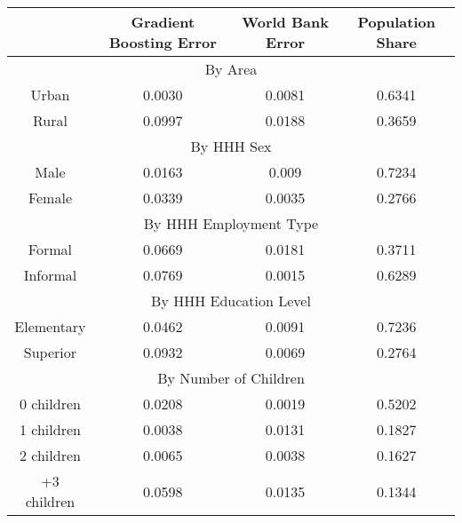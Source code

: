 \begin{table}[]
\begin{tabular}{@{}cccc@{}}
\toprule
            & Gradient Boosting Error & World Bank Error & Population Share \\ \midrule
\multicolumn{4}{c}{By Area}                                                 \\ \midrule
Urban       & 0.0030                  & 0.0081           & 0.6341           \\
Rural       & 0.0997                  & 0.0188           & 0.3659           \\ \midrule
\multicolumn{4}{c}{By HHH Sex}                                              \\ \midrule
Male        & 0.0163                  & 0.009            & 0.7234           \\
Female      & 0.0339                  & 0.0035           & 0.2766           \\ \midrule
\multicolumn{4}{c}{By HHH Employment Type}                                  \\ \midrule
Formal      & 0.0669                  & 0.0181           & 0.3711           \\
Informal    & 0.0769                  & 0.0015           & 0.6289           \\ \midrule
\multicolumn{4}{c}{By HHH Education Level}                                  \\ \midrule
Elementary  & 0.0462                  & 0.0091           & 0.7236           \\
Superior    & 0.0932                  & 0.0069           & 0.2764           \\ \midrule
\multicolumn{4}{c}{By Number of Children}                                   \\ \midrule
0 children  & 0.0208                  & 0.0019           & 0.5202           \\
1 children  & 0.0038                  & 0.0131           & 0.1827           \\
2 children  & 0.0065                  & 0.0038           & 0.1627           \\
+3 children & 0.0598                  & 0.0135           & 0.1344          
\end{tabular}
\end{table}